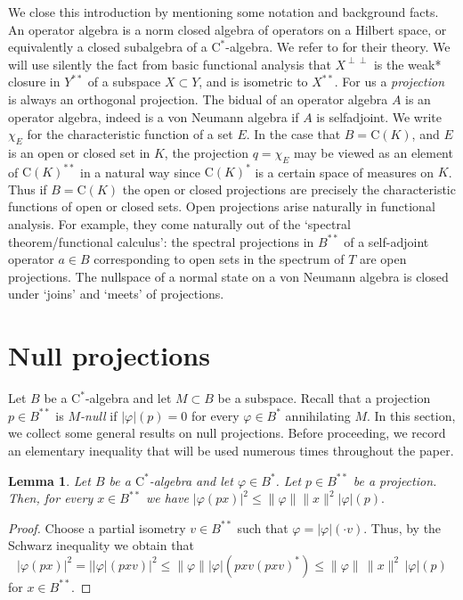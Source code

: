 \documentclass[10pt]{amsart}
\newcommand{\rC}{\mathrm{C}}
\renewcommand{\phi}{\varphi}
\newtheorem{lemma}{Lemma}[section]
\theoremstyle{definition}
\begin{document}
We close this introduction by mentioning some notation and background facts.  An operator algebra is a norm closed algebra of operators on a Hilbert space, 
or equivalently a closed subalgebra of a $\rC^*$-algebra. We refer to 
 \cite{BLM2004} for their theory.  We will use silently the fact from basic functional analysis that
$X^{\perp \perp}$ is the weak* closure in $Y^{**}$ of
a subspace  $X \subset
Y$, and is isometric to $X^{**}$.   For us a {\em projection}
is always an orthogonal projection.   The bidual of an operator algebra $A$ is an operator algebra, indeed is a von Neumann algebra
if $A$ is selfadjoint. 
We write $\chi_E$ for
the characteristic function of a set $E$.   In the 
case that $B = \rC(K)$, and $E$ is an open or  closed set
 in $K$, the projection $q = \chi_E$  may be viewed as an element of $\rC(K)^{**}$ in a natural way since 
$\rC(K)^*$ is a certain space of measures on $K$.     Thus if $B = \rC(K)$
the open or closed projections are precisely the   characteristic functions of  open or  closed sets.
Open projections arise naturally in functional analysis. For example, they come naturally out of the ‘spectral theorem/functional calculus': the spectral projections in
$B^{**}$ of a self-adjoint operator $a \in B$ corresponding to open sets in the spectrum of $T$ are open projections. 
 The nullspace of a normal state on a von Neumann algebra is closed under `joins' and `meets' of projections.  
 

\section{Null projections}\label{S:null}


Let $B$ be a $\rC^*$-algebra and let $M\subset B$ be a subspace. Recall that a projection $p\in B^{**}$ is \emph{$M$-null} if $|\phi|(p)=0$ for every $\phi\in B^*$ annihilating $M$.  
In this section, we collect some general results on null projections. 
Before proceeding, we record an elementary inequality that will be used numerous times throughout the paper.

\begin{lemma}\label{L:stateineq}
Let $B$ be a $\rC^*$-algebra and let $\phi\in B^*$. Let $p\in B^{**}$ be a projection. Then, for every $x\in B^{**}$ we have
$
|\phi(px)|^2\leq \|\phi\| \|x\|^2|\phi|(p).
$
\end{lemma} 
\begin{proof} 
Choose a partial isometry $v\in B^{**}$ such that $\phi=|\phi|(\cdot v)$. Thus, by the Schwarz inequality we obtain  that 
\[
|\phi(px)|^2=||\phi|(pxv)|^2\leq \|\phi\||\phi|(pxv(pxv)^*)\leq  \|\phi\| 
\, \|x\|^2 \, |\phi|(p) 
\] 
for $x\in B^{**}$. \end{proof}
\end{document}
